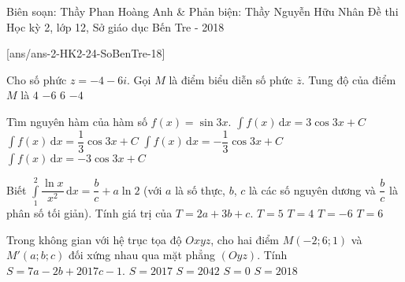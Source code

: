 \begin{name}
{Biên soạn: Thầy Phan Hoàng Anh \& Phản biện: Thầy Nguyễn Hữu Nhân}
{Đề thi Học kỳ 2, lớp 12, Sở giáo dục Bến Tre - 2018}
\end{name}
\setcounter{ex}{0}\setcounter{bt}{0}
[ans/ans-2-HK2-24-SoBenTre-18]
\begin{ex}%
	Cho số phức $z=-4-6i$. Gọi $M$ là điểm biểu diễn số phức $\overline{z}$. Tung độ của điểm $M$ là
	\choice
	{$4$}
	{$-6$}
	{\True $6$}
	{$-4$}
\end{ex}
\begin{ex}%
	Tìm nguyên hàm của hàm số $f(x)=\sin3x$. 
	\choice
	{$\displaystyle\int f(x)\mathrm{\,d}x=3\cos3x+C$}
	{$\displaystyle\int f(x)\mathrm{\,d}x=\dfrac{1}{3}\cos3x+C$}
	{\True $\displaystyle\int f(x)\mathrm{\,d}x=-\dfrac{1}{3}\cos3x+C$}
	{$\displaystyle\int f(x)\mathrm{\,d}x=-3\cos3x+C$}
\end{ex}
\begin{ex}%
	Biết $\displaystyle\int\limits_1^2\dfrac{\ln x}{x^2}\mathrm{\,d}x=\dfrac{b}{c}+a\ln2$ (với $a$ là số thực, $b$, $c$ là các số nguyên dương và $\dfrac{b}{c}$ là phân số tối giản). Tính giá trị của $T=2a+3b+c$. 
	\choice
	{$T=5$}
	{\True $T=4$}
	{$T=-6$}
	{$T=6$}
\end{ex}
\begin{ex}%
	Trong không gian với hệ trục tọa độ $Oxyz$, cho hai điểm $M(-2;6;1)$ và $M'(a;b;c)$ đối xứng nhau qua mặt phẳng $(Oyz)$. Tính $S=7a-2b+2017c-1$.
	\choice
	{$S=2017$}
	{$S=2042$}
	{$S=0$}
	{\True $S=2018$}
\end{ex}
